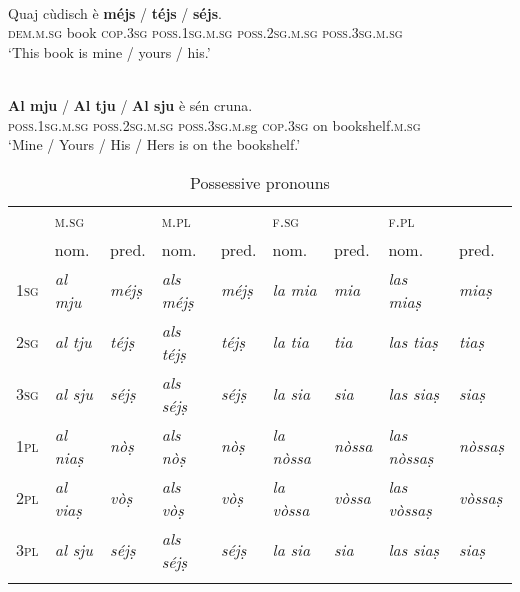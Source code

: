 \ea\label{}
\\
\gll Quaj cùdisch è \textbf{méjs} / \textbf{téjs} / \textbf{séjs}.\\
\textsc{dem.m.sg} book \textsc{cop.3sg} \textsc{poss.1sg.m.sg} {} \textsc{poss.2sg.m.sg} {} \textsc{poss.3sg.m.sg} \\
\glt `This book is mine / yours / his.'
\z

\ea
\label{}
\\
\gll \textbf{Al mju} / \textbf{Al tju} / \textbf{Al sju} è sén cruna.\\
\textsc{poss.1sg.m.sg} {} \textsc{poss.2sg.m.sg} {} \textsc{poss.3sg.m}.sg \textsc{cop.3sg} on bookshelf.\textsc{m.sg}   \\
\glt `Mine / Yours / His / Hers is on the bookshelf.'
\z


\begin{table}
	\caption{Possessive pronouns}
	\label{posspron}
	\begin{tabular}{lllllllll}
		\lsptoprule
		& \textsc{m.sg} && \textsc{m.pl}  && \textsc{f.sg}  && \textsc{f.pl}\\
		& nom. & pred. & nom. & pred. & nom. & pred. & nom. & pred.\\
		\midrule
		\textsc{1sg}  & \textit{al mju}  & \textit{méjṣ} & \textit{als méjṣ} & \textit{méjṣ} & \textit{la mia} & \textit{mia} & \textit{las miaṣ} & \textit{miaṣ}\\
		\textsc{2sg} & \textit{al tju} & \textit{téjṣ} & \textit{als téjṣ} &\textit{téjṣ} & \textit{la tia} & \textit{tia} & \textit{las tiaṣ} & \textit{tiaṣ}\\
		\textsc{3sg} & \textit{al sju} & \textit{séjṣ} & \textit{als séjṣ}& \textit{séjṣ} & \textit{la sia} & \textit{sia} & \textit{las siaṣ} & \textit{siaṣ}\\
		\textsc{1pl} & \textit{al niaṣ} & \textit{nòṣ} & \textit{als nòṣ} & \textit{nòṣ}  & \textit{la nòssa} & \textit{nòssa} & \textit{las nòssaṣ} & \textit{nòssaṣ}\\
		\textsc{2pl} & \textit{al viaṣ}  & \textit{vòṣ} & \textit{als vòṣ} & \textit{vòṣ} & \textit{la vòssa} & \textit{vòssa} & \textit{las vòssaṣ} & \textit{vòssaṣ}\\
		\textsc{3pl} & \textit{al sju} & \textit{séjṣ} & \textit{als séjṣ} & \textit{séjṣ} & \textit{la sia} & \textit{sia} & \textit{las siaṣ} & \textit{siaṣ}\\
		\lspbottomrule
	\end{tabular}
\end{table}

